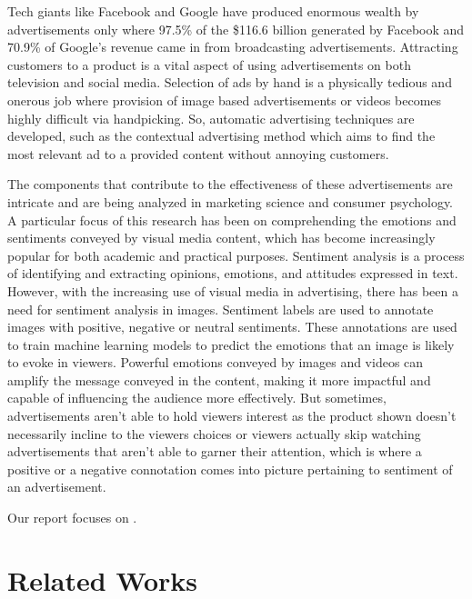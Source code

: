 \documentclass[conference]{IEEEtran}
\begin{document}
Tech giants like Facebook and Google have produced enormous wealth by advertisements only where 97.5\% of the \$116.6 billion generated by Facebook \cite{b1} and 70.9\% of Google’s revenue \cite{b2} came in from broadcasting advertisements. Attracting customers to a product is a vital aspect of using  advertisements on both television and social media. Selection of ads by hand is a physically tedious and onerous job where provision of image based advertisements or videos becomes highly difficult via handpicking. So, automatic advertising techniques are developed, such as the contextual advertising method which aims to find the most relevant ad to a provided content without annoying customers.

The components that contribute to the effectiveness of these advertisements are intricate and are being analyzed in marketing science and consumer psychology. A particular focus of this research has been on comprehending the emotions and sentiments conveyed by visual media content, which has become increasingly popular for both academic and practical purposes. Sentiment analysis is a process of identifying and extracting opinions, emotions, and attitudes expressed in text. However, with the increasing use of visual media in advertising, there has been a need for sentiment analysis in images. Sentiment labels are used to annotate images with positive, negative or neutral sentiments. These annotations are used to train machine learning models to predict the emotions that an image is likely to evoke in viewers.
Powerful emotions conveyed by images and videos can amplify the message conveyed in the content, making it more impactful and capable of influencing the audience more effectively. But sometimes, advertisements aren’t able to hold viewers interest as the product shown doesn’t necessarily incline to the viewers choices or viewers actually skip watching advertisements that aren’t able to garner their attention, which is where a positive or a negative connotation comes into picture pertaining to sentiment of an advertisement.

Our report focuses on .


\section{Related Works}

\end{document}

